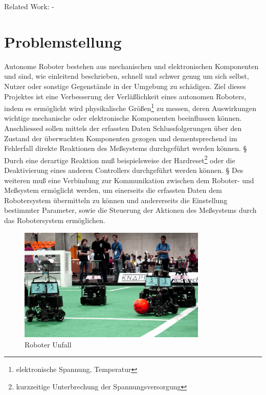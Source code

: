 \documentclass[
	11pt,								%
	a4paper,						%
	oneside,						%
	titlepage,					%
	headsepline,				%
	DIV13,							%
	abstracton,	 				%
	BCOR0cm,						%
	bibliography=totoc, %
]{scrreprt}							%
\begin{document}
Related Work:
-






\chapter{Problemstellung}
\label{cha:Problemstellung}
Autonome Roboter bestehen aus mechanischen und elektronischen Komponenten und sind, wie einleitend beschrieben, 
schnell und schwer genug um sich selbst, Nutzer oder sonstige Gegenstände in der Umgebung zu schädigen. 
Ziel dieses Projektes ist eine Verbesserung der Verläßlichkeit eines autonomen Roboters, indem es ermöglicht wird 
physikalische Größen\footnote{elektronische Spannung, Temperatur} zu messen, deren Auswirkungen wichtige mechanische oder elektronische Komponenten beeinflussen können. 
Anschliessed sollen mittels der erfassten Daten Schlussfolgerungen über den Zustand der überwachten Komponenten gezogen und dementsprechend im Fehlerfall
 direkte Reaktionen des Meßsystems durchgeführt werden können. 
§  Durch eine derartige Reaktion muß beispielsweise der Hardreset\footnote{kurzzeitige Unterbrechung der Spannungsversorgung} oder 
die Deaktivierung eines anderen Controllers durchgeführt werden können. § 
Des weiteren muß eine Verbindung zur Kommunikation zwischen dem Roboter- und Meßsystem ermöglicht werden, um einerseits die 
erfassten Daten dem Robotersystem übermitteln zu können und andererseits die Einstellung bestimmter Parameter, sowie die Steuerung der Aktionen des Meßsystems durch das Robotersystem ermöglichen.

\begin{figure}[htb]
\centering
\includegraphics[width=0.8\textwidth]{images/robots.png}
\caption{Roboter Unfall}
\label{fig:Roboter Unfall}
\end{figure}

\end{document}
